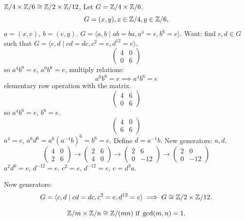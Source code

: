\documentclass[10pt, a4paper]{article}
\begin{document}
\begin{example}
    $\mathbb{Z} / 4 \times \mathbb{Z} / 6 \cong \mathbb{Z} / 2 \times \mathbb{Z} / 12$,
    Let $G = \mathbb{Z} / 4 \times \mathbb{Z} / 6$.
    \[
    G = (x, y), x \in \mathbb{Z} / 4, y \in \mathbb{Z} / 6,
    \]
    $a = (x, e)$,
    $b = (e, y)$.
    $G = \langle a, b \mid ab = ba, a ^ 4 = e, b ^ 6 = e\rangle$.
    Want:
    find $c, d \in G$ such that $G = \langle c, d \mid cd = dc, c ^ 2 = e, d ^ {12} = e\rangle$.
    \[
    \begin{pmatrix}
        4 & 0 \\ 0 & 6
    \end{pmatrix}
    \]
    so $a ^ 4b ^ 0 = e$,
    $a ^ 0b ^ 6 = e$,
    multiply relations:
    \[
    a ^ 0b ^ 6 = e \implies a ^ 4b ^ 6 = e
    \]
    elementary row operation with the matrix.
    \[
    \begin{pmatrix}
        4 & 6 \\ 0 & 6
    \end{pmatrix}
    \]
    so $a ^ 4b ^ 6 = e$,
    $b ^ 6 = e$.
    \[
    \begin{pmatrix}
        4 & 0 \\ 6 & 6
    \end{pmatrix}
    \]
    $a ^ 4 = e$,
    $a ^ 6d ^ 6 = a ^ 6(a ^ {-1}b) ^ 6 = b ^ 6 = e$.
    Define $d = a ^ {-1}b$.
    New generators:
    $a, d$.
    \[
    \begin{pmatrix}
        4 & 0 \\ 2 & 6
    \end{pmatrix} \to \begin{pmatrix}
        2 & 6 \\ 4 & 0
    \end{pmatrix} \to \begin{pmatrix}
        2 & 6 \\ 0 & -12
    \end{pmatrix} \to \begin{pmatrix}
        2 & 0 \\ 0 & -12
    \end{pmatrix}
    \]
    $a ^ 2d ^ 6 = e$,
    $d ^ {-12} = e$.
    $c ^ 2 = e$,
    $d ^ {-12} = e$,
    $c = d ^ 3a$.

    New generators:
    \[
    G = \langle c, d \mid cd = dc, c ^ 2 = e, d ^ {12} = e\rangle \implies G \cong \mathbb{Z} / 2 \times \mathbb{Z} / 12.
    \]
\end{example}

\begin{theorem}
    \[
    \mathbb{Z} / m \times \mathbb{Z} / n \cong \mathbb{Z} / (mn)\text{ if }\gcd(m, n) = 1.
    \]
\end{theorem}
\end{document}
